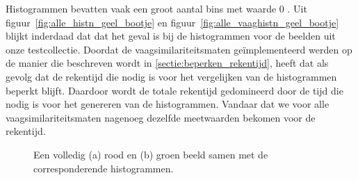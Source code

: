 Histogrammen bevatten vaak een groot aantal bins met waarde $0$ \cite{berens:compressed_colour_histograms}. Uit 
figuur~\ref{fig:alle_histn_geel_bootje} en figuur~\ref{fig:alle_vaaghistn_geel_bootje} blijkt 
inderdaad dat dat het geval is bij de histogrammen voor de beelden uit onze testcollectie. 
Doordat de vaagsimilariteitsmaten ge\"implementeerd werden op de manier die beschreven wordt in 
\ref{sectie:beperken_rekentijd}, heeft dat als gevolg dat de rekentijd die nodig is voor het 
vergelijken van de histogrammen beperkt blijft. Daardoor wordt de totale rekentijd gedomineerd door 
de tijd die nodig is voor het genereren van de histogrammen. Vandaar dat we voor alle 
vaagsimilariteitsmaten nagenoeg dezelfde meetwaarden bekomen voor de rekentijd. 

\begin{figure}[bp]
\caption{\label{fig:histogrammen_rood_en_groen}Een volledig (a) rood en (b) groen beeld samen met de corresponderende histogrammen.}
\vspace{10pt}
\centering
{}
\vspace{5pt}
\end{figure}


